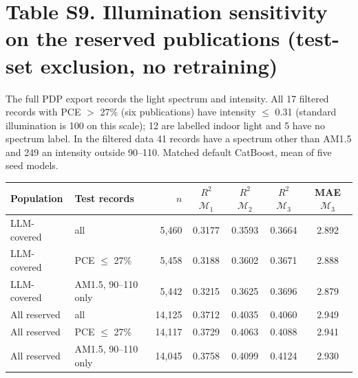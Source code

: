 \documentclass[10pt]{article}
\begin{document}
\section*{Table S9. Illumination sensitivity on the reserved publications (test-set exclusion, no retraining)}
The full PDP export records the light spectrum and intensity. All 17 filtered records with PCE $>$ 27\% (six publications) have intensity $\leq$ 0.31 (standard illumination is 100 on this scale); 12 are labelled indoor light and 5 have no spectrum label. In the filtered data 41 records have a spectrum other than AM1.5 and 249 an intensity outside 90--110. Matched default CatBoost, mean of five seed models.\par\smallskip
\begin{tabular}{llrcccc}\toprule Population & Test records & $n$ & $R^2$ $\mathcal{M}_1$ & $R^2$ $\mathcal{M}_2$ & $R^2$ $\mathcal{M}_3$ & MAE $\mathcal{M}_3$\\\midrule
LLM-covered & all & 5,460 & 0.3177 & 0.3593 & 0.3664 & 2.892\\
LLM-covered & PCE $\leq$ 27\% & 5,458 & 0.3188 & 0.3602 & 0.3671 & 2.888\\
LLM-covered & AM1.5, 90--110 only & 5,442 & 0.3215 & 0.3625 & 0.3696 & 2.879\\
All reserved & all & 14,125 & 0.3712 & 0.4035 & 0.4060 & 2.949\\
All reserved & PCE $\leq$ 27\% & 14,117 & 0.3729 & 0.4063 & 0.4088 & 2.941\\
All reserved & AM1.5, 90--110 only & 14,045 & 0.3758 & 0.4099 & 0.4124 & 2.930\\
\bottomrule\end{tabular}\par
\end{document}

